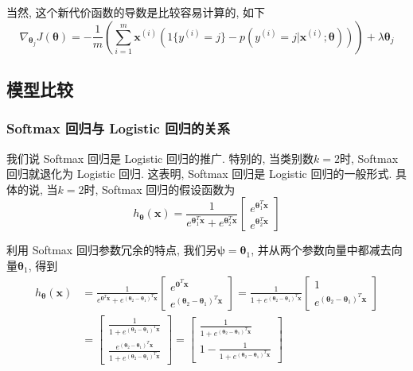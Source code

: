 \documentclass[a4paper,UTF8]{ctexart}
\theoremstyle{plain} \newtheorem{theorem}{定理}[section]
\theoremstyle{plain} \newtheorem{definition}{定义}[section]
\theoremstyle{plain} \newtheorem{lemma}{引理}[section]
\theoremstyle{plain} \newtheorem{proposition}{命题}[section]
\theoremstyle{plain} \newtheorem{example}{例}[section]
\theoremstyle{plain} \newtheorem{remark}{注}[section]
\theoremstyle{plain} \newtheorem{corollary}{推论}[section]
\begin{document}
当然, 这个新代价函数的导数是比较容易计算的, 如下
\begin{equation*}
\nabla_{\bm{\theta}_{j}} J(\bm{\theta}) = - \frac{1}{m} \left( \sum_{i=1}^{m} \bm{x}^{(i)} \left( 1\{y^{(i)}=j\} - p(y^{(i)} = j | \bm{x}^{(i)}; \bm{\theta}) \right) \right) + \lambda \bm{\theta}_{j}
\end{equation*}


\subsection{模型比较}
\subsubsection{Softmax 回归与 Logistic 回归的关系}
我们说 Softmax 回归是 Logistic 回归的推广. 特别的, 当类别数$k=2$时, Softmax 回归就退化为 Logistic 回归. 这表明, Softmax 回归是 Logistic 回归的一般形式. 具体的说, 当$k=2$时, Softmax 回归的假设函数为
$$
h_{\bm{\theta}}(\bm{x}) = \frac{1}{e^{\bm{\theta}_{1}^{T} \bm{x}} + e^{\bm{\theta}_{2}^{T} \bm{x}}} 
\begin{bmatrix}
e^{\bm{\theta}_{1}^{T} \bm{x}} \\ 
e^{\bm{\theta}_{2}^{T} \bm{x}} 
\end{bmatrix}
$$

利用 Softmax 回归参数冗余的特点, 我们另$\bm{\psi} = \bm{\theta}_1$, 并从两个参数向量中都减去向量$\bm{\theta}_1$, 得到
\begin{align*}
h_{\bm{\theta}}(\bm{x}) & = \frac{1}{e^{\bm{0}^{T} \bm{x}} + e^{(\bm{\theta}_{2} -  \bm{\theta}_{1})^{T} \bm{x}}} 
\begin{bmatrix}
e^{\bm{0}^{T} \bm{x}} \\ 
e^{(\bm{\theta}_{2} -  \bm{\theta}_{1})^{T} \bm{x}} 
\end{bmatrix} 
=
\frac{1}{1 + e^{(\bm{\theta}_{2} -  \bm{\theta}_{1})^{T} \bm{x}}} 
\begin{bmatrix}
1 \\ 
e^{(\bm{\theta}_{2} -  \bm{\theta}_{1})^{T} \bm{x}} 
\end{bmatrix} \\ 
& = 
\begin{bmatrix}
\frac{1}{1 + e^{(\bm{\theta}_{2} -  \bm{\theta}_{1})^{T} \bm{x}}} \\ 
\frac{e^{(\bm{\theta}_{2} -  \bm{\theta}_{1})^{T} \bm{x}}} {1 + e^{(\bm{\theta}_{2} -  \bm{\theta}_{1})^{T} \bm{x}}} 
\end{bmatrix}
=
\begin{bmatrix}
\frac{1}{1 + e^{(\bm{\theta}_{2} -  \bm{\theta}_{1})^{T} \bm{x}}} \\ 
1 -  \frac{1}{1 + e^{(\bm{\theta}_{2} -  \bm{\theta}_{1})^{T} \bm{x}}}
\end{bmatrix}
\end{align*}
\end{document}
